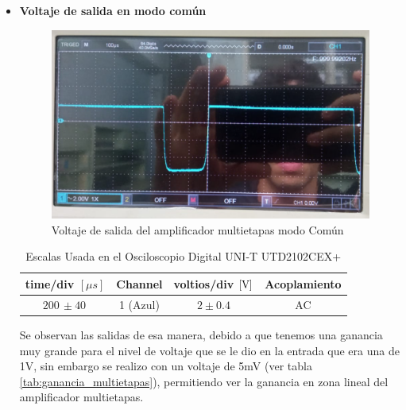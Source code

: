 \begin{enumerate}
\begin{itemize}
          \item \textbf{Voltaje de salida en modo común}
                \begin{figure}[H]
                  \centering
                  \renewcommand{\figurename}{Imagen}
                  \includegraphics[width=\textwidth]{Imagenes/vocmulti.png}
                  \caption{Voltaje de salida del amplificador multietapas modo Común}
                  \label{fig:vocmulti}
                \end{figure}

                \begin{table}[H]
                  \centering
                  \begin{tabular}{|c|c|c|c|}
                    \hline
                    \textbf{time/div} $[\mu s]$ & \textbf{Channel} & \textbf{voltios/div $[\volt]$} & \textbf{Acoplamiento} \\ \hline
                    $200 \, \pm 40 \, $         & 1 (Azul)         & $2 \pm 0.4  $                  & AC                    \\ \hline
                  \end{tabular}
                  \caption{Escalas Usada en el Osciloscopio Digital UNI-T UTD2102CEX+}
                  \label{tab:escala_vocmulti}
                \end{table}

                Se observan las salidas de esa manera, debido a que tenemos una ganancia muy grande para el nivel de voltaje que se le dio en la entrada que era una de 1V, sin embargo se realizo con un voltaje de 5mV (ver tabla \ref{tab:ganancia_multietapas}), permitiendo ver la ganancia en zona lineal del amplificador multietapas.

        \end{itemize}
\end{enumerate}


